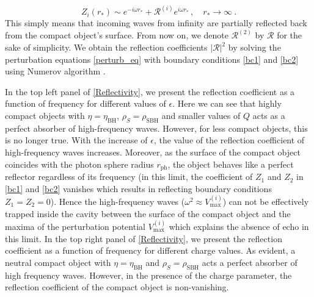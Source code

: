 \documentclass[aps,prd,twocolumn,floatfix,noshowpacs,tightenlines,noshowkeys,superscriptaddress,amsmath,amssymb,
nofootinbib]{revtex4-1}
\renewcommand\[{\begin{equation}}
\renewcommand\]{\end{equation}}
\begin{document}
\begin{equation}\label{reflection_asymtotic}
Z_{i}(r_{*})\sim e^{-i \omega r_{*}} + \mathcal{R}^{(i)} e^{i \omega r_{*}}\,,\quad{r_{*}\to \infty}~.
\end{equation}
This simply means that incoming waves from infinity are partially reflected back from the compact object's surface.  
From now on, we denote $\mathcal{R}^{(2)}$ by $\mathcal{R}$ for the sake of simplicity. We obtain the reflection coefficients $|\mathcal{R}|^2$ by solving the perturbation equations \autoref{perturb_eq} with boundary conditions \autoref{bc1} and \autoref{bc2} using Numerov algorithm \cite{ Caruso:2014kba}.\par  In the top left panel of \autoref{Reflectivity}, we present the reflection coefficient as a function of frequency for different values of $\epsilon$.  Here we can see that highly compact objects with $\eta=\eta_{\textrm{BH}}$, $\rho_{S}=\rho_{\textrm{SBH}}$ and smaller values of $Q$ acts as a perfect absorber of high-frequency waves. However, for less compact objects, this is no longer true. With the increase of $\epsilon$, the value of the reflection coefficient of high-frequency waves increases. Moreover, as the surface of the compact object coincides with the photon sphere radius $r_{\textrm{ph}}$, the object behaves like a perfect reflector regardless of its frequency (in this limit, the coefficient of $Z_1$ and $Z_2$ in \autoref{bc1} and \autoref{bc2} vanishes which results in reflecting boundary conditions $Z_1=Z_2=0$). Hence the high-frequency waves ($\omega^2\approx V_{\textrm{max}}^{(i)}$) can not be effectively trapped inside the cavity between the surface of the compact object and the maxima of the perturbation potential $V_{\textrm{max}}^{(i)}$ which explains the absence of echo in this limit.    
 In the top right panel of \autoref{Reflectivity}, we present the reflection coefficient as a function of frequency for different charge values. As evident, a neutral compact object with $\eta=\eta_{\textrm{BH}}$ and $\rho_{S}=\rho_{\textrm{SBH}}$ acts a perfect absorber of high frequency waves. However, in the presence of the charge parameter, the reflection coefficient of the compact object is non-vanishing.  \par
\end{document}
